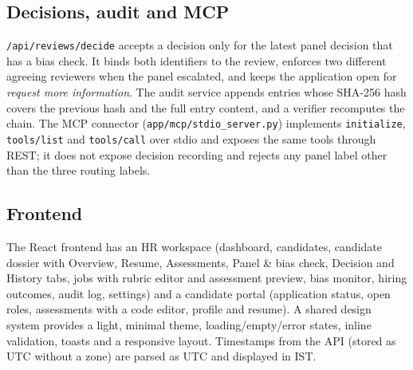 \subsection{Decisions, audit and MCP}
\texttt{/api/reviews/decide} accepts a decision only for the latest panel decision that has a bias check. It binds both identifiers to the review, enforces two different agreeing reviewers when the panel escalated, and keeps the application open for \emph{request more information}. The audit service appends entries whose SHA-256 hash covers the previous hash and the full entry content, and a verifier recomputes the chain. The MCP connector (\texttt{app/mcp/stdio\_server.py}) implements \texttt{initialize}, \texttt{tools/list} and \texttt{tools/call} over stdio and exposes the same tools through REST; it does not expose decision recording and rejects any panel label other than the three routing labels.

\subsection{Frontend}
The React frontend has an HR workspace (dashboard, candidates, candidate dossier with Overview, Resume, Assessments, Panel \& bias check, Decision and History tabs, jobs with rubric editor and assessment preview, bias monitor, hiring outcomes, audit log, settings) and a candidate portal (application status, open roles, assessments with a code editor, profile and resume). A shared design system provides a light, minimal theme, loading/empty/error states, inline validation, toasts and a responsive layout. Timestamps from the API (stored as UTC without a zone) are parsed as UTC and displayed in IST.

